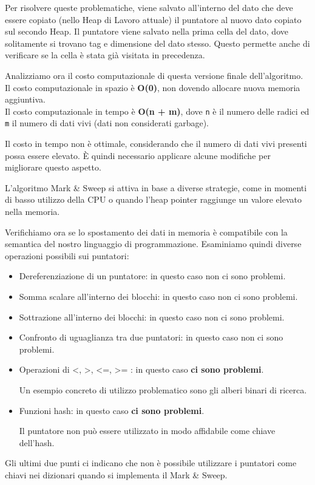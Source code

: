 \documentclass{article}
\begin{document}
Per risolvere queste problematiche, viene salvato all'interno del dato che deve essere copiato (nello Heap di Lavoro attuale) il puntatore al nuovo dato copiato sul secondo Heap. Il puntatore viene salvato nella prima cella del dato, dove solitamente si trovano tag e dimensione del dato stesso. Questo permette anche di verificare se la cella è stata già visitata in precedenza.

\vspace{8pt}
Analizziamo ora il costo computazionale di questa versione finale dell'algoritmo.\\
Il costo computazionale in spazio è \textbf{O(0)}, non dovendo allocare nuova memoria aggiuntiva.\\
Il costo computazionale in tempo è \textbf{O(n + m)}, dove \texttt{n} è il numero delle radici ed \texttt{m} il numero di dati vivi (dati non considerati garbage).

Il costo in tempo non è ottimale, considerando che il numero di dati vivi presenti possa essere elevato. È quindi necessario applicare alcune modifiche per migliorare questo aspetto.

L'algoritmo Mark \& Sweep si attiva in base a diverse strategie, come in momenti di basso utilizzo della CPU o quando l'heap pointer raggiunge un valore elevato nella memoria.

\pagebreak

Verifichiamo ora se lo spostamento dei dati in memoria è compatibile con la semantica del nostro linguaggio di programmazione. Esaminiamo quindi diverse operazioni possibili sui puntatori:
\begin{itemize}
    \item Dereferenziazione di un puntatore: in questo caso non ci sono problemi.
    \item Somma scalare all'interno dei blocchi: in questo caso non ci sono problemi.
    \item Sottrazione all'interno dei blocchi: in questo caso non ci sono problemi.
    \item Confronto di uguaglianza tra due puntatori: in questo caso non ci sono problemi.
    \item Operazioni di <, >, <=, >= : in questo caso \textbf{ci sono problemi}.
    
    Un esempio concreto di utilizzo problematico sono gli alberi binari di ricerca.
    \item Funzioni hash: in questo caso \textbf{ci sono problemi}. 
    
    Il puntatore non può essere utilizzato in modo affidabile come chiave dell'hash.
\end{itemize}
Gli ultimi due punti ci indicano che non è possibile utilizzare i puntatori come chiavi nei dizionari quando si implementa il Mark \& Sweep.
\end{document}
